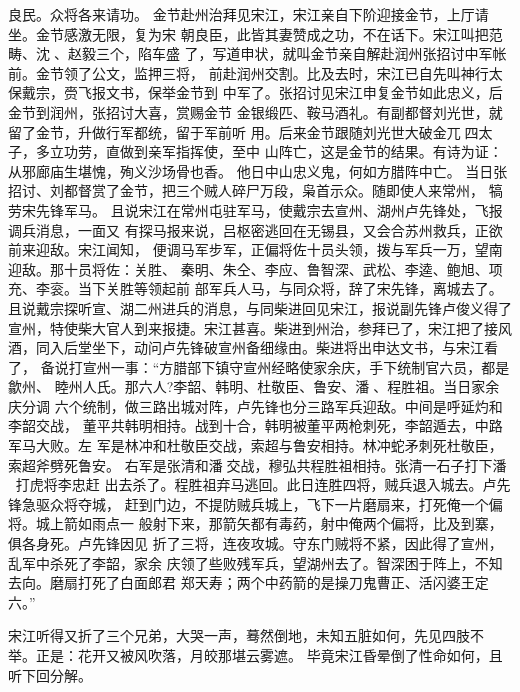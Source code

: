 良民。众将各来请功。
金节赴州治拜见宋江，宋江亲自下阶迎接金节，上厅请坐。金节感激无限，复为宋
朝良臣，此皆其妻赞成之功，不在话下。宋江叫把范畴、沈、赵毅三个，陷车盛
了，写道申状，就叫金节亲自解赴润州张招讨中军帐前。金节领了公文，监押三将，
前赴润州交割。比及去时，宋江已自先叫神行太保戴宗，赍飞报文书，保举金节到
中军了。张招讨见宋江申复金节如此忠义，后金节到润州，张招讨大喜，赏赐金节
金银缎匹、鞍马酒礼。有副都督刘光世，就留了金节，升做行军都统，留于军前听
用。后来金节跟随刘光世大破金兀四太子，多立功劳，直做到亲军指挥使，至中
山阵亡，这是金节的结果。有诗为证：
从邪廊庙生堪愧，殉义沙场骨也香。
他日中山忠义鬼，何如方腊阵中亡。
当日张招讨、刘都督赏了金节，把三个贼人碎尸万段，枭首示众。随即使人来常州，
犒劳宋先锋军马。
且说宋江在常州屯驻军马，使戴宗去宣州、湖州卢先锋处，飞报调兵消息，一面又
有探马报来说，吕枢密逃回在无锡县，又会合苏州救兵，正欲前来迎敌。宋江闻知，
便调马军步军，正偏将佐十员头领，拨与军兵一万，望南迎敌。那十员将佐：关胜、
秦明、朱仝、李应、鲁智深、武松、李逵、鲍旭、项充、李衮。当下关胜等领起前
部军兵人马，与同众将，辞了宋先锋，离城去了。
且说戴宗探听宣、湖二州进兵的消息，与同柴进回见宋江，报说副先锋卢俊义得了
宣州，特使柴大官人到来报捷。宋江甚喜。柴进到州治，参拜已了，宋江把了接风
酒，同入后堂坐下，动问卢先锋破宣州备细缘由。柴进将出申达文书，与宋江看了，
备说打宣州一事：“方腊部下镇守宣州经略使家余庆，手下统制官六员，都是歙州、
睦州人氏。那六人?李韶、韩明、杜敬臣、鲁安、潘、程胜祖。当日家余庆分调
六个统制，做三路出城对阵，卢先锋也分三路军兵迎敌。中间是呼延灼和李韶交战，
董平共韩明相持。战到十合，韩明被董平两枪刺死，李韶遁去，中路军马大败。左
军是林冲和杜敬臣交战，索超与鲁安相持。林冲蛇矛刺死杜敬臣，索超斧劈死鲁安。
右军是张清和潘交战，穆弘共程胜祖相持。张清一石子打下潘，打虎将李忠赶
出去杀了。程胜祖弃马逃回。此日连胜四将，贼兵退入城去。卢先锋急驱众将夺城，
赶到门边，不提防贼兵城上，飞下一片磨扇来，打死俺一个偏将。城上箭如雨点一
般射下来，那箭矢都有毒药，射中俺两个偏将，比及到寨，俱各身死。卢先锋因见
折了三将，连夜攻城。守东门贼将不紧，因此得了宣州，乱军中杀死了李韶，家余
庆领了些败残军兵，望湖州去了。智深困于阵上，不知去向。磨扇打死了白面郎君
郑天寿；两个中药箭的是操刀鬼曹正、活闪婆王定六。”

宋江听得又折了三个兄弟，大哭一声，蓦然倒地，未知五脏如何，先见四肢不
举。正是：花开又被风吹落，月皎那堪云雾遮。
毕竟宋江昏晕倒了性命如何，且听下回分解。